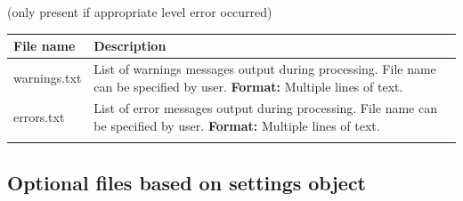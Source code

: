 \documentclass[
]{article}
\begin{document}
(only present if appropriate level error occurred)

\begin{longtable}[]{@{}ll@{}}
\toprule
\begin{minipage}[b]{0.42\columnwidth}\raggedright
File name\strut
\end{minipage} & \begin{minipage}[b]{0.52\columnwidth}\raggedright
Description\strut
\end{minipage}\tabularnewline
\midrule
\endhead
\begin{minipage}[t]{0.42\columnwidth}\raggedright
warnings.txt\strut
\end{minipage} & \begin{minipage}[t]{0.52\columnwidth}\raggedright
List of warnings messages output during processing. File name can be
specified by user. \textbf{Format:} Multiple lines of text.\strut
\end{minipage}\tabularnewline
\begin{minipage}[t]{0.42\columnwidth}\raggedright
errors.txt\strut
\end{minipage} & \begin{minipage}[t]{0.52\columnwidth}\raggedright
List of error messages output during processing. File name can be
specified by user. \textbf{Format:} Multiple lines of text.\strut
\end{minipage}\tabularnewline
\begin{minipage}[t]{0.42\columnwidth}\raggedright
\strut
\end{minipage} & \begin{minipage}[t]{0.52\columnwidth}\raggedright
\strut
\end{minipage}\tabularnewline
\bottomrule
\end{longtable}

\hypertarget{optional-files-based-on-settings-object}{%
\subsection{Optional files based on settings
object}\label{optional-files-based-on-settings-object}}
\end{document}
